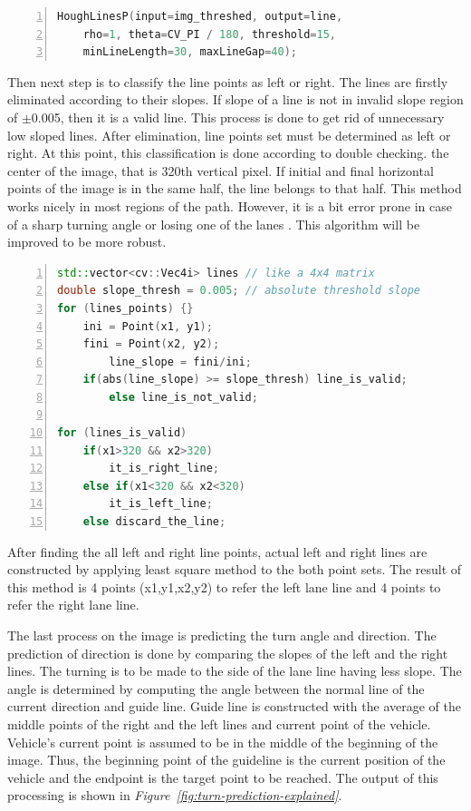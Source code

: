 \documentclass[a4paper,12pt]{article}
\begin{document}
	\begin{lstlisting}[language=C++,float=t,numbers=left,frame=single,caption=Hough Lines Function with its Parameters, captionpos=b, label=sc:hough-call]
HoughLinesP(input=img_threshed, output=line,
	rho=1, theta=CV_PI / 180, threshold=15, 
	minLineLength=30, maxLineGap=40);
	\end{lstlisting}
				Then next step is to classify the line points as left or right. The lines are firstly eliminated according to their slopes. If slope of a line is not in invalid slope region of $\pm$0.005, then it is a valid line. This process is done to get rid of unnecessary low sloped lines. After elimination, line points set must be determined as left or right. At this point, this classification is done according to double checking. the center of the image, that is 320th vertical pixel. If initial and final horizontal points of the image is in the same half, the line belongs to that half. This method works nicely in most regions of the path. However, it is a bit error prone in case of a sharp turning angle or losing one of the lanes . This algorithm will be improved to be more robust.
	\begin{lstlisting}[language=C++,float=t,numbers=left,frame=single,caption=The Algorithm to Classify the Lane Lines as Right or Left, captionpos=b, label=sc:left-right-lines]
std::vector<cv::Vec4i> lines // like a 4x4 matrix
double slope_thresh = 0.005; // absolute threshold slope
for (lines_points) {}
	ini = Point(x1, y1);
	fini = Point(x2, y2);
		line_slope = fini/ini;
	if(abs(line_slope) >= slope_thresh) line_is_valid;
		else line_is_not_valid;

for (lines_is_valid)	
	if(x1>320 && x2>320)
		it_is_right_line;
	else if(x1<320 && x2<320)
		it_is_left_line;
	else discard_the_line;
\end{lstlisting}

			After finding the all left and right line points, actual left and right lines are constructed by applying least square method to the both point sets. The result of this method is 4 points (x1,y1,x2,y2) to refer the left lane line and 4 points to refer the right lane line.
			
			The last process on the image is predicting the turn angle and direction. The prediction of direction is done by comparing the slopes of the left and the right lines. The turning is to be made to the side of the lane line having less slope. The angle is determined by computing the angle between the normal line of the current direction and guide line. Guide line is constructed with the average of the middle points of the right and the left lines and current point of the vehicle. Vehicle's current point is assumed to be in the middle of the beginning of the image. Thus, the beginning point of the guideline is the current position of the vehicle and the endpoint is the target point to be reached. The output of this processing is shown in \textit{Figure~\ref{fig:turn-prediction-explained}}.
				
\end{document}
